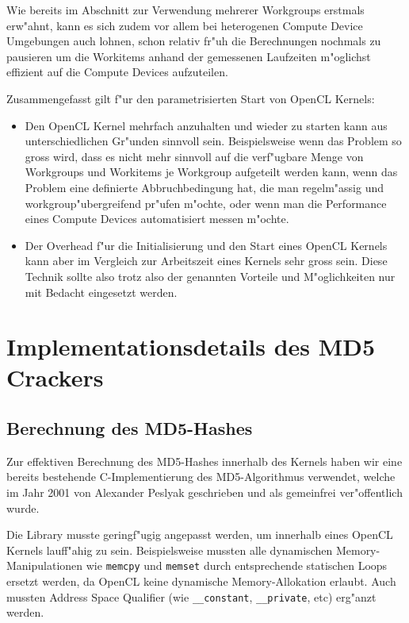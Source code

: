 \begin{refsection}
Wie bereits im Abschnitt zur Verwendung mehrerer Workgroups erstmals erw"ahnt, kann
es sich zudem vor allem bei heterogenen Compute Device Umgebungen auch lohnen,
schon relativ fr"uh die Berechnungen nochmals zu pausieren um die Workitems anhand
der gemessenen Laufzeiten m"oglichst effizient auf die Compute
Devices aufzuteilen.

Zusammengefasst gilt f"ur den parametrisierten Start von OpenCL Kernels:

\begin{itemize}
 \item Den OpenCL Kernel mehrfach anzuhalten und wieder zu starten
       kann aus unterschiedlichen Gr"unden sinnvoll sein. Beispielsweise
       wenn das Problem so gross wird, dass es nicht mehr sinnvoll auf 
       die verf"ugbare Menge von Workgroups und Workitems je Workgroup
       aufgeteilt werden kann, wenn das Problem eine definierte 
       Abbruchbedingung hat, die man regelm"assig und workgroup"ubergreifend
			 pr"ufen m"ochte, oder wenn man die Performance eines
			 Compute Devices automatisiert messen m"ochte.
 \item Der Overhead f"ur die Initialisierung und den Start eines OpenCL Kernels
			 kann aber im Vergleich zur Arbeitszeit eines Kernels sehr gross sein. Diese
			 Technik sollte also trotz also der genannten Vorteile und M"oglichkeiten
			 nur mit Bedacht eingesetzt werden.
\end{itemize}


\section{Implementationsdetails des MD5 Crackers}

\subsection{Berechnung des MD5-Hashes}
\label{crypto:md5lib}

Zur effektiven Berechnung des MD5-Hashes innerhalb des Kernels haben wir eine
bereits bestehende C-Implementierung des MD5-Algorithmus
verwendet\cite{crypto:md5_impl}, welche im Jahr 2001 von Alexander Peslyak
geschrieben und als gemeinfrei ver"offentlich wurde.

Die Library musste geringf"ugig angepasst werden, um innerhalb eines OpenCL
Kernels lauff"ahig zu sein. Beispielsweise mussten alle dynamischen
Memory-Manipulationen wie \texttt{memcpy} und \texttt{memset} durch
entsprechende statischen Loops ersetzt werden, da OpenCL keine dynamische
Memory-Al\-lo\-ka\-ti\-on erlaubt. Auch mussten Address Space Qualifier (wie
\texttt{\_\_constant}, \texttt{\_\_private}, etc) erg"anzt werden.


\end{refsection}
